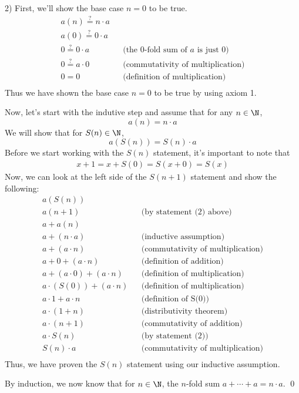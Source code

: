 \begin{paragraph}{2)}
        First, we'll show the base case $n = 0$ to be true.
        \begin{align*}
            a(n) \stackrel{?}{=} n \cdot a \\
            a(0) \stackrel{?}{=} 0 \cdot a \\
            0 \stackrel{?}{=} 0 \cdot a && \text{(the 0-fold sum of $a$ is just 0)} \\
            0 \stackrel{?}{=} a \cdot 0 && \text{(commutativity of multiplication)} \\
            0 = 0 && \text{(definition of multiplication)} \\
        \end{align*}
        Thus we have shown the base case $n = 0$ to be true by using axiom 1.
        \spacing

        Now, let's start with the indutive step and assume that for any $n \in \N$,
        $$a(n) = n \cdot a$$
        We will show that for $S(n) \in \N$,
        $$a(S(n)) = S(n) \cdot a$$
        Before we start working with the $S(n)$ statement, it's important to note that
        \begin{align}x + 1 = x + S(0) = S(x + 0) = S(x)\end{align}
        Now, we can look at the left side of the $S(n + 1)$ statement and show the following:
        \begin{align*}
            a(S(n)) \\
            a(n + 1) && \text{(by statement (2) above)} \\
            a + a(n) \\
            a + (n \cdot a) && \text{(inductive assumption)} \\
            a + (a \cdot n) && \text{(commutativity of multiplication)} \\
            a + 0 + (a \cdot n) && \text{(definition of addition)} \\
            a + (a \cdot 0) + (a \cdot n) && \text{(definition of multiplication)} \\
            a \cdot (S(0)) + (a \cdot n) && \text{(definition of multiplication)} \\
            a \cdot 1 + a \cdot n && \text{(definition of S(0))} \\
            a \cdot (1 + n) && \text{(distributivity theorem)} \\
            a \cdot (n + 1) && \text{(commutativity of addition)} \\
            a \cdot S(n) && \text{(by statement (2))} \\
            S(n) \cdot a && \text{(commutativity of multiplication)} \\
        \end{align*}
        Thus, we have proven the $S(n)$ statement using our inductive assumption.
        \spacing

        By induction, we now know that for $n \in \N$, the $n$-fold sum $a + \cdots + a = n \cdot a$. \qed
    \end{paragraph}

